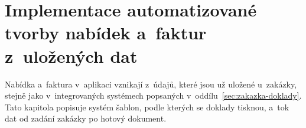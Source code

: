 \chapter{Implementace automatizované tvorby nabídek a~faktur z~uložených dat}\label{kap:dokumenty}

Nabídka a~faktura v~aplikaci vznikají z~údajů, které jsou už uložené u~zakázky, stejně jako v~integrovaných systémech popsaných v~oddílu~\ref{sec:zakazka-doklady}. Tato kapitola popisuje systém šablon, podle kterých se doklady tisknou, a~tok dat od zadání zakázky po hotový dokument.

\begingroup\sloppy


\endgroup
